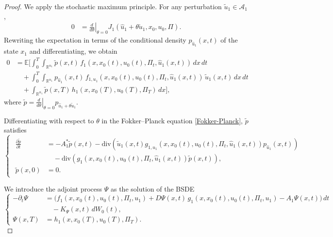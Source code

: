 \documentclass[10pt,a4paper]{amsart}
\begin{document}
\begin{proof}
We apply the stochastic maximum principle. For any perturbation \(\tilde{u}_1 \in \mathcal{A}_1\),
\begin{equation}
\label{Condicion optimalidad}
    \begin{aligned}
    0 &= \left.\frac{d}{d\theta}\right|_{\theta=0} J_1(\hat{u}_1+\theta\tilde{u}_1,x_0,u_0,\Pi).
    \end{aligned}
\end{equation}
Rewriting the expectation in terms of the conditional density $p_{\hat{u}_1}(x,t)$ of the state $x_1$ and differentiating, we obtain
\begin{align*}
0 &= \mathbb{E}\Bigg[\int_0^T\int_{\mathbb{R}^{n_1}} \tilde{p}(x,t)\, f_1(x,x_0(t),u_0(t),\Pi_t,\hat{u}_1(x,t)) \, dx\,dt \\
&\quad + \int_0^T\int_{\mathbb{R}^{n_1}} p_{\hat{u}_1}(x,t)\, f_{1,u_1}(x,x_0(t),u_0(t),\Pi_t,\hat{u}_1(x,t)) \, \tilde{u}_1(x,t)\, dx\,dt \\
&\quad + \int_{\mathbb{R}^{n_1}} \tilde{p}(x,T)\, h_1(x,x_0(T),u_0(T),\Pi_T)\, dx \Bigg],
\end{align*}
where \(\tilde{p}=\left.\tfrac{d}{d\theta}\right|_{\theta=0} p_{\hat{u}_1+\theta\tilde{u}_1}\).

Differentiating with respect to $\theta$ in the Fokker--Planck equation \eqref{Fokker-Planck}, $\tilde{p}$ satisfies
    \begin{equation*}
        \begin{cases}
            \begin{aligned}
                \frac{\partial \tilde{p}}{\partial t} &= -A_1^*\tilde{p}(x,t)-\mathrm{div}\left(\tilde{u}_1(x,t)g_{1,u_1}\left(x,x_0(t),u_0(t),\Pi_t,\hat{u}_1(x,t)\right)p_{\hat{u}_1}(x,t)\right)\\
                &\quad - \mathrm{div}\left(g_1\left(x,x_0(t),u_0(t),\Pi_t,\hat{u}_1(x,t)\right)\tilde{p}(x,t)\right),\\
                \tilde{p}(x,0) &= 0.
            \end{aligned}
        \end{cases}
    \end{equation*}

We introduce the adjoint process $\Psi$ as the solution of the BSDE
    \[
        \left\{
        \begin{aligned}
            -\partial_t \Psi &= \Big( f_1(x, x_0(t), u_0(t), \Pi_t, u_1) +  D\Psi(x,t)\, g_1(x,x_0(t),u_0(t),\Pi_t,u_1) - A_1 \Psi(x,t) \Big)\, dt \\
            &\quad - K_\Psi(x,t)\, dW_0(t), \\
            \Psi(x,T) &= h_1 \left( x, x_0(T), u_0(T), \Pi_T \right).
        \end{aligned}
        \right.
    \]


\end{proof}
\end{document}
